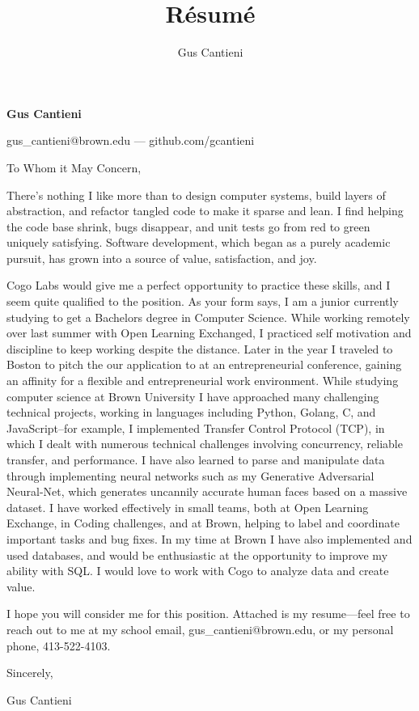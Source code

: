 \documentclass[12pt]{article}
\title{R\'esum\'e}
\author{Gus Cantieni}
\makeatletter
\renewcommand{\maketitle}{
	\begin{center}
		{\huge\bfseries Gus Cantieni}
		\vspace{0.25em}

		gus\_cantieni@brown.edu --- github.com/gcantieni

		\vspace{0.75em}
	\end{center}
}
\makeatother
\begin{document}
\maketitle

\vspace{1em}
\fontsize{12}{15}\selectfont
\noindent
To Whom it May Concern, 
\vspace{1em}

\noindent
There's nothing I like more than to design computer systems, build layers of abstraction, and refactor tangled code to make it sparse and lean. I find helping the code base shrink, bugs disappear, and unit tests go from red to green uniquely satisfying. Software development, which began as a purely academic pursuit, has grown into a source of value, satisfaction, and joy.
\vspace{0.75em}

\noindent
Cogo Labs would give me a perfect opportunity to practice these skills, and I seem quite qualified to the position. As your form says, I am a junior currently studying to get a Bachelors degree in Computer Science. While working remotely over last summer with Open Learning Exchanged, I practiced self motivation and discipline to keep working despite the distance. Later in the year I traveled to Boston to pitch the our application to at an entrepreneurial conference, gaining an affinity for a flexible and entrepreneurial work environment. While studying computer science at Brown University I have approached many challenging technical projects, working in languages including Python, Golang, C, and JavaScript--for example, I implemented Transfer Control Protocol (TCP), in which I dealt with numerous technical challenges involving concurrency, reliable transfer, and performance. I have also learned to parse and manipulate data through implementing neural networks such as my Generative Adversarial Neural-Net, which generates uncannily accurate human faces based on a massive dataset. I have worked effectively in small teams, both at Open Learning Exchange, in Coding challenges, and at Brown, helping to label and coordinate important tasks and bug fixes. In my time at Brown I have also implemented and used databases, and would be enthusiastic at the opportunity to improve my ability with SQL. I would love to work with Cogo to analyze data and create value. 

\vspace{0.75em}
\noindent
I hope you will consider me for this position. Attached is my resume---feel free to reach out to me at my school email, gus\_cantieni@brown.edu, or my personal phone, 413-522-4103.


\vspace{2em}
\hfill Sincerely,

\hfill Gus Cantieni
\end{document}
